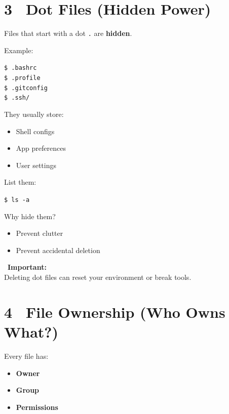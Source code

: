 \documentclass[12pt]{article}
\newcommand{\hiddenicon}{\faEyeSlash}
\newcommand{\usericon}{\faUser}
\newcommand{\handicon}{\faHandPointRight}
\begin{document}
\section*{3 \hiddenicon\ Dot Files (Hidden Power)}

Files that start with a dot \texttt{.} are \textbf{hidden}.

Example:

\begin{highlightbox}
\texttt{\$ .bashrc}\\
\texttt{\$ .profile}\\
\texttt{\$ .gitconfig}\\
\texttt{\$ .ssh/}
\end{highlightbox}

They usually store:

\begin{itemize}
    \item Shell configs
    \item App preferences
    \item User settings
\end{itemize}

List them:

\begin{highlightbox}
\texttt{\$ ls -a}
\end{highlightbox}

Why hide them?

\begin{itemize}
    \item Prevent clutter
    \item Prevent accidental deletion
\end{itemize}

\begin{infobox}
\handicon\ \textbf{Important:}\\
Deleting dot files can reset your environment or break tools.
\end{infobox}

\section*{4 \usericon\ File Ownership (Who Owns What?)}

Every file has:

\begin{itemize}
    \item \textbf{Owner}
    \item \textbf{Group}
    \item \textbf{Permissions}
\end{itemize}
\end{document}
